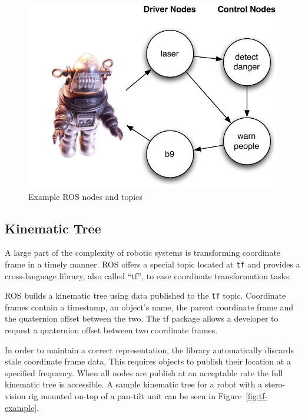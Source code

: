 \begin{figure}[ht]
\includegraphics{images/middleware-ros.pdf}
\caption{Example ROS nodes and topics\label{fig:middleware-ros}}
\end{figure}

\subsection{Kinematic Tree}
\label{sub:ros_tf}
A large part of the complexity of robotic systems is transforming coordinate frame in a timely manner. ROS offers a special topic located at \verb!tf! and provides a cross-language library, also called ``tf'', to ease coordinate transformation tasks.

ROS builds a kinematic tree using data published to the \verb!tf! topic. Coordinate frames contain a timestamp, an object's name, the parent coordinate frame and the quaternion offset between the two. The tf package allows a developer to request a quaternion offset between two coordinate frames. 

In order to maintain a correct representation, the library automatically discards stale coordinate frame data. This requires objects to publish their location at a specified frequency. When all nodes are publish at an acceptable rate the full kinematic tree is accessible. A sample kinematic tree for a robot with a stero-vision rig mounted on-top of a pan-tilt unit can be seen in Figure~\ref{fig:tf-example}.

